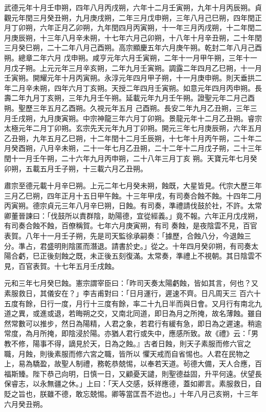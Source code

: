 \begin{pinyinscope}
 武德元年十月壬申朔，四年八月丙戌朔，六年十二月壬寅朔，九年十月丙辰朔。貞觀元年閏三月癸丑朔，九月庚戌朔，二年三月戊申朔，三年八月己巳朔，四年閏正月丁卯朔，六年正月乙卯朔，九年閏四月丙寅朔，十一年三月丙戌朔，十二年閏二月庚辰朔，十三年八月辛未朔，十七年六月己卯朔，十八年十月辛丑朔，二十年閏三月癸巳朔，二十二年八月己酉朔。高宗顯慶五年六月庚午朔。乾封二年八月己酉朔。總章二年六月
 戊申朔。咸亨元年六月壬寅朔，二年十一月甲午朔，三年十一月戊子朔。上元元年三月辛亥朔，二年九月壬寅朔。調露二年四月乙巳朔，十一月壬寅朔。開耀元年十月丙寅朔。永淳元年四月甲子朔，十一月庚申朔。則天垂拱二年二月辛未朔，四年六月丁亥朔。天授二年四月壬寅朔。如意元年四月丙申朔。長壽二年九月丁亥朔，三年九月壬午朔。延載元年九月壬午朔。證聖元年二月己酉朔。聖歷三年五月乙酉朔。久視元年五月
 己酉朔。長安二年九月乙丑朔，三年三月壬戌朔，九月庚寅朔。中宗神龍三年六月丁卯朔。景龍元年十二月乙丑朔。睿宗太極元年二月丁卯朔。玄宗先天元年九月丁卯朔。開元三年七月庚辰朔，六年五月乙丑朔，九年五月乙巳朔，十二年閏十二月壬辰朔，十七年十月丙午朔，二十年二月癸酉朔，八月辛未朔，二十一年七月乙丑朔，二十二年十二月戊子朔，二十三年閏十一月壬午朔，二十六年九月丙申朔，二十八年三月丁亥
 朔。天寶元年七月癸卯朔，五載五月壬子朔，十三載六月乙丑朔。



 肅宗至德元載十月辛巳朔。上元二年七月癸未朔，蝕既，大星皆見。代宗大歷三年三月乙巳朔，四年正月十五日甲午蝕。十三年甲戌，有司奏合蝕不蝕。十四年二月丙寅朔。德宗貞元三年八月辛巳朔，日蝕。有司奏，準禮請伐鼓於社，不許。太常卿董晉諫曰：「伐鼓所以責群陰，助陽德，宜從經義。」竟不報。六年正月戊戌朔，有司奏合蝕不蝕，百僚稱賀。七年六月庚寅朔，有司
 奏蝕，是夜陰雲不見，百官表賀。八年十一月壬子朔，先是司天監徐承嗣奏：「據歷，合蝕八分，今退蝕三分。準占，君盛明則陰匿而潛退。請書於史。」從之。十年四月癸卯朔，有司奏太陽合虧，巳正後刻蝕之既，未正後五刻復滿。太常奏，準禮上不視朝。其日陰雲不見，百官表賀。十七年五月壬戌蝕。



 元和三年七月癸巳蝕。憲宗謂宰臣曰：「昨司天奏太陽虧蝕，皆如其言，何也？又素服救日，其儀安在？」李吉甫對曰：「日月運行，遲速不齊。日凡周天三
 百六十五度有餘，日行一度，月行十三度有餘，率二十九日半而與日會。又月行有南北九道之異，或進或退，若晦朔之交，又南北同道，即日為月之所掩，故名薄蝕。雖自然常數可以推步，然日為陽精，人君之象，若君行有緩有急，即日為之遲速。稍逾常度，為月所掩，即陰浸於陽。亦猶人君行或失中，應感所致。故《禮》云：「男教不修，陽事不得，謫見於天，日為之蝕。』古者日蝕，則天子素服而修六官之職，月蝕，則後素服而修六宮之職，皆所以
 懼天戒而自省惕也。人君在民物之上，易為驕盈，故聖人制禮，務乾恭兢惕，以奉若天道。茍德大備，天人合應，百福斯臻。陛下恭己向明，日慎一日，又顧憂天譴，則聖德益固，升平何遠。伏望長保睿志，以永無疆之休。」上曰：「天人交感，妖祥應德，蓋如卿言。素服救日，自貶之旨也，朕雖不德，敢忘兢惕。卿等當匡吾不迨也。」十年八月己亥朔，十三年六月癸丑朔。




\end{pinyinscope}
